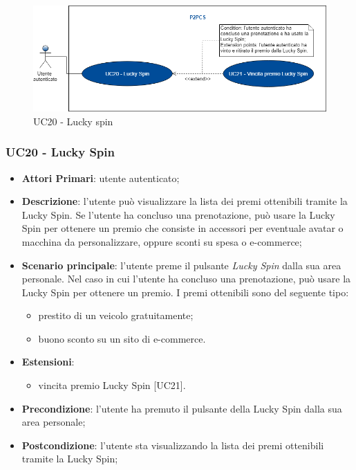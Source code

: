 \begin{figure}[h]
	\includegraphics[width=13cm]{res/images/UC20Luckyspin.png}
	\centering
	\caption{UC20 - Lucky spin}
\end{figure}
\subsubsection{UC20 - Lucky Spin}
\begin{itemize}
	\item \textbf{Attori Primari}: utente autenticato;
	\item \textbf{Descrizione}:	l'utente può visualizzare la lista dei premi ottenibili tramite la Lucky Spin\glo. Se l'utente ha concluso una prenotazione, può usare la Lucky Spin per ottenere un premio che consiste in accessori per eventuale avatar o macchina da personalizzare, oppure sconti su spesa o e-commerce;
	\item \textbf{Scenario principale}: l'utente preme il pulsante \textit{Lucky Spin} dalla sua area personale. Nel caso in cui l'utente ha concluso una prenotazione, può usare la Lucky Spin per ottenere un premio. I premi ottenibili sono del seguente tipo:
	\begin{itemize}
		\item prestito di un veicolo gratuitamente;
		\item buono sconto su un sito di e-commerce.	
	\end{itemize}
	\item \textbf{Estensioni}: 
	\begin{itemize}
		\item vincita premio Lucky Spin [UC21].
	\end{itemize}
	\item \textbf{Precondizione}: l'utente ha premuto il pulsante della Lucky Spin dalla sua area personale;
	\item \textbf{Postcondizione}: l'utente sta visualizzando la lista dei premi ottenibili tramite la Lucky Spin;
\end{itemize}

